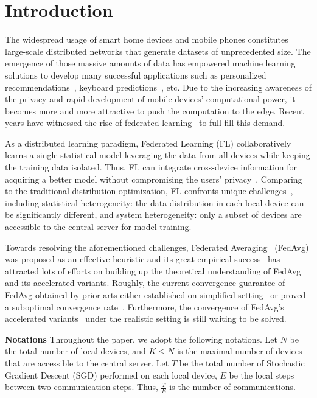 

\section{Introduction}
The widespread usage of smart home devices and mobile phones constitutes
large-scale distributed networks that generate datasets of unprecedented size.
The emergence of those massive amounts of data has empowered machine learning
solutions to develop many successful applications such as personalized
recommendations~\cite{chen2018federated}, keyboard predictions~\cite{47586},
etc. Due to the increasing awareness of the privacy and rapid development of
mobile devices' computational power, it becomes more and more attractive to
push the computation to the edge. Recent years have witnessed the rise of
federated learning~\cite{mcmahan2016communication} to full fill this demand.

As a distributed learning paradigm, Federated Learning (FL) collaboratively
learns a single statistical model leveraging the data from all devices while
keeping the training data isolated.  Thus, FL can integrate cross-device
information for acquiring a better model  without compromising the users'
privacy~\cite{kairouz2019advances}. Comparing to the traditional distribution optimization,  FL confronts unique
challenges~\cite{li2019convergence,smith2017federated}, including statistical heterogeneity: the data distribution in each local device can be significantly different, and system heterogeneity: only a subset of devices are accessible to the central server for model training. 

Towards resolving the aforementioned challenges, Federated
Averaging~\cite{mcmahan2016communication} (FedAvg) was proposed as an
effective heuristic and its great empirical success~\cite{47586} has attracted
lots of efforts on building up the theoretical understanding of FedAvg
and its accelerated variants. 
Roughly, the current convergence guarantee of FedAvg obtained by prior arts either established on simplified setting~\cite{stich2018local,khaled2019first,wang2018cooperative,yu2019parallel} or proved a suboptimal 
convergence rate~\cite{li2019convergence}. Furthermore, the convergence of
FedAvg's accelerated variants~\cite{yu2019linear,huo2020faster,liu2019accelerating} under the realistic setting is still waiting to be solved.

\textbf{Notations}
Throughout the paper, we adopt the following notations. Let $N$ be the total
number of local devices, and $K \leq N$ is the maximal number of devices
that are accessible to the central server.  Let $T$ be the total number of  Stochastic Gradient Descent (SGD) performed on each local device, $E$ be the local steps between two communication steps. Thus, $\frac{T}{E}$ is
the number of communications.

